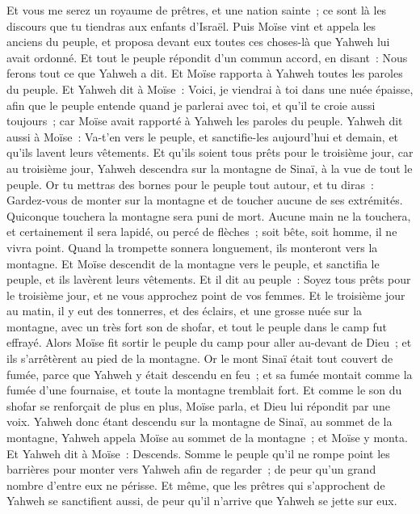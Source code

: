 \begin{multicols}{2}
Et vous me serez un royaume de prêtres, et une nation sainte~; ce sont là les discours que tu tiendras aux enfants d'Israël.
Puis Moïse vint et appela les anciens du peuple, et proposa devant eux toutes ces choses-là que Yahweh lui avait ordonné.
Et tout le peuple répondit d'un commun accord, en disant~: Nous ferons tout ce que Yahweh a dit. Et Moïse rapporta à Yahweh toutes les paroles du peuple.
Et Yahweh dit à Moïse~: Voici, je viendrai à toi dans une nuée épaisse, afin que le peuple entende quand je parlerai avec toi, et qu'il te croie aussi toujours~; car Moïse avait rapporté à Yahweh les paroles du peuple.
Yahweh dit aussi à Moïse~: Va-t'en vers le peuple, et sanctifie-les aujourd'hui et demain, et qu'ils lavent leurs vêtements.
Et qu'ils soient tous prêts pour le troisième jour, car au troisième jour, Yahweh descendra sur la montagne de Sinaï, à la vue de tout le peuple.
Or tu mettras des bornes pour le peuple tout autour, et tu diras~: Gardez-vous de monter sur la montagne et de toucher aucune de ses extrémités. Quiconque touchera la montagne sera puni de mort.
Aucune main ne la touchera, et certainement il sera lapidé, ou percé de flèches~; soit bête, soit homme, il ne vivra point. Quand la trompette sonnera longuement, ils monteront vers la montagne.
Et Moïse descendit de la montagne vers le peuple, et sanctifia le peuple, et ils lavèrent leurs vêtements.
Et il dit au peuple~: Soyez tous prêts pour le troisième jour, et ne vous approchez point de vos femmes.
Et le troisième jour au matin, il y eut des tonnerres, et des éclairs, et une grosse nuée sur la montagne, avec un très fort son de shofar, et tout le peuple dans le camp fut effrayé.
Alors Moïse fit sortir le peuple du camp pour aller au-devant de Dieu~; et ils s'arrêtèrent au pied de la montagne.
Or le mont Sinaï était tout couvert de fumée, parce que Yahweh y était descendu en feu~; et sa fumée montait comme la fumée d'une fournaise, et toute la montagne tremblait fort.
Et comme le son du shofar se renforçait de plus en plus, Moïse parla, et Dieu lui répondit par une voix.
Yahweh donc étant descendu sur la montagne de Sinaï, au sommet de la montagne, Yahweh appela Moïse au sommet de la montagne~; et Moïse y monta.
Et Yahweh dit à Moïse~: Descends. Somme le peuple qu'il ne rompe point les barrières pour monter vers Yahweh afin de regarder~; de peur qu'un grand nombre d'entre eux ne périsse.
Et même, que les prêtres qui s'approchent de Yahweh se sanctifient aussi, de peur qu'il n'arrive que Yahweh se jette sur eux.

\end{multicols}
